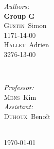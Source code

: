 \begin{titlepage}
		\vfill
        \begin{minipage}{0.4\textwidth}
        \begin{flushleft} \large
        \emph{Authors:}\\
        \textbf{Group G}\\
        \textsc{Gustin}~Simon \\
        1171-14-00\\
        \textsc{Hallet}~Adrien \\
        3276-13-00\\
        \end{flushleft}
        \end{minipage}
        ~
        \begin{minipage}{0.4\textwidth}
        \begin{flushright} \large
        \emph{Professor:} \\
         \textsc{Mens}~Kim \\%
         \emph{Assistant:}\\
         \textsc{Duhoux}~Benoît
        \end{flushright}
        \end{minipage}\\[1cm]



        {\large \today}\\[2cm] %




        \vfill %
    \end{titlepage}

